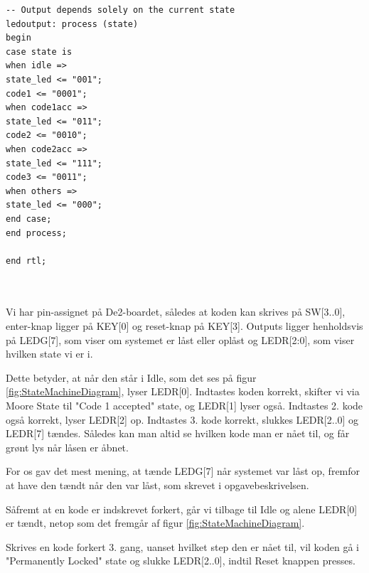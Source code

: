 \begin{enumerate}
\begin{lstlisting}[caption={VHDL koden for kodelås},label={lst:code_lock}]
-- Output depends solely on the current state
ledoutput: process (state)
begin
case state is
when idle =>
state_led <= "001";
code1 <= "0001";
when code1acc =>
state_led <= "011";
code2 <= "0010";
when code2acc =>
state_led <= "111";
code3 <= "0011";
when others =>
state_led <= "000";
end case;
end process;

end rtl;



\end{lstlisting}

Vi har pin-assignet på De2-boardet, således at koden kan skrives på SW[3..0], enter-knap ligger på KEY[0] og reset-knap på KEY[3]. Outputs ligger henholdsvis på LEDG[7], som viser om systemet er låst eller oplåst og LEDR[2:0], som viser hvilken state vi er i. 

Dette betyder, at når den står i Idle, som det ses på figur \ref{fig:StateMachineDiagram}, lyser LEDR[0]. Indtastes koden korrekt, skifter vi via Moore State til "Code 1 accepted" state, og LEDR[1] lyser også.
Indtastes 2. kode også korrekt, lyser LEDR[2] op. 
Indtastes 3. kode korrekt, slukkes LEDR[2..0] og LEDR[7] tændes. Således kan man altid se hvilken kode man er nået til, og får grønt lys når låsen er åbnet. 

For os gav det mest mening, at tænde LEDG[7] når systemet var låst op, fremfor at have den tændt når den var låst, som skrevet i opgavebeskrivelsen. 


Såfremt at en kode er indskrevet forkert, går vi tilbage til Idle og alene LEDR[0] er tændt, netop som det fremgår af figur \ref{fig:StateMachineDiagram}. 

Skrives en kode forkert 3. gang, uanset hvilket step den er nået til, vil koden gå i "Permanently Locked" state og slukke LEDR[2..0], indtil Reset knappen presses.


\end{enumerate}
